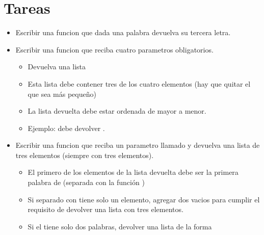 \documentclass[a5paper,9pt,spanish]{sphinxmanual}
\begin{document}
\section{Tareas}
\label{\detokenize{list:tareas}}\begin{itemize}
\item {} 
\sphinxAtStartPar
Escribir una funcion que dada una palabra devuelva su tercera letra.

\item {} 
\sphinxAtStartPar
Escribir una funcion que reciba cuatro parametros obligatorios.
\begin{itemize}
\item {} 
\sphinxAtStartPar
Devuelva una lista

\item {} 
\sphinxAtStartPar
Esta lista debe contener tres de los cuatro elementos (hay que quitar el que sea más pequeño)

\item {} 
\sphinxAtStartPar
La lista devuelta debe estar ordenada de mayor a menor.

\item {} 
\sphinxAtStartPar
Ejemplo:  debe devolver \sphinxcode{\sphinxupquote{{[}12, 9, 8{]}}}.

\end{itemize}

\item {} 
\sphinxAtStartPar
Escribir una funcion que reciba un parametro llamado  y devuelva una
lista de tres elementos (siempre con tres elementos).
\begin{itemize}
\item {} 
\sphinxAtStartPar
El primero de los elementos de la lista devuelta debe ser la primera
palabra de  (separada con la función )

\item {} 
\sphinxAtStartPar
Si  separado con  tiene solo un elemento,
agregar dos  vacios para cumplir el requisito de devolver una
lista con tres elementos.

\item {} 
\sphinxAtStartPar
Si el  tiene solo dos palabras, devolver una lista de la
forma 


\end{itemize}
\end{itemize}
\end{document}

